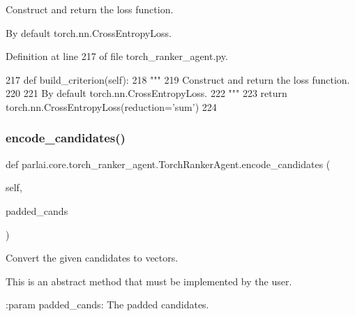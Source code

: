 \begin{DoxyVerb}Construct and return the loss function.

By default torch.nn.CrossEntropyLoss.
\end{DoxyVerb}
 

Definition at line 217 of file torch\+\_\+ranker\+\_\+agent.\+py.


\begin{DoxyCode}
217     \textcolor{keyword}{def }build\_criterion(self):
218         \textcolor{stringliteral}{"""}
219 \textcolor{stringliteral}{        Construct and return the loss function.}
220 \textcolor{stringliteral}{}
221 \textcolor{stringliteral}{        By default torch.nn.CrossEntropyLoss.}
222 \textcolor{stringliteral}{        """}
223         \textcolor{keywordflow}{return} torch.nn.CrossEntropyLoss(reduction=\textcolor{stringliteral}{'sum'})
224 
\end{DoxyCode}
\mbox{\label{classparlai_1_1core_1_1torch__ranker__agent_1_1TorchRankerAgent_a1c8e4925f558783a51a28ccb577c42c7}} 
\subsubsection{\texorpdfstring{encode\+\_\+candidates()}{encode\_candidates()}}
{\footnotesize\ttfamily def parlai.\+core.\+torch\+\_\+ranker\+\_\+agent.\+Torch\+Ranker\+Agent.\+encode\+\_\+candidates (\begin{DoxyParamCaption}\item[{}]{self,  }\item[{}]{padded\+\_\+cands }\end{DoxyParamCaption})}

\begin{DoxyVerb}Convert the given candidates to vectors.

This is an abstract method that must be implemented by the user.

:param padded_cands:
    The padded candidates.
\end{DoxyVerb}
 

